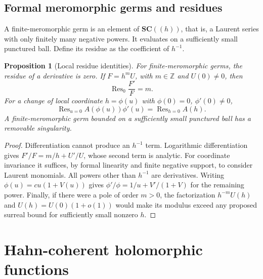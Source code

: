 \documentclass[11pt,letterpaper]{article}
\newtheorem{proposition}[theorem]{Proposition}
\theoremstyle{definition}
\theoremstyle{remark}
\newcommand{\SC}{\mathbf{SC}}
\newcommand{\Z}{\mathbb Z}
\newcommand{\res}{\operatorname{Res}}
\numberwithin{equation}{section}
\begin{document}
\subsection{Formal meromorphic germs and residues}
A finite-meromorphic germ is an element of $\SC((h))$, that is, a Laurent series with only finitely many negative powers. It evaluates on a sufficiently small punctured ball. Define its residue as the coefficient of $h^{-1}$.

\begin{proposition}[Local residue identities]\label{prop:formalres}
For finite-meromorphic germs, the residue of a derivative is zero. If $F=h^mU$, with $m\in\Z$ and $U(0)\ne0$, then
\[
 \res_0\frac{F'}F=m.
\]
For a change of local coordinate $h=\phi(u)$ with $\phi(0)=0$, $\phi'(0)\ne0$,
\[
 \res_{u=0} A(\phi(u))\phi'(u)=\res_{h=0}A(h).
\]
A finite-meromorphic germ bounded on a sufficiently small punctured ball has a removable singularity.
\end{proposition}
\begin{proof}
Differentiation cannot produce an $h^{-1}$ term. Logarithmic differentiation gives $F'/F=m/h+U'/U$, whose second term is analytic. For coordinate invariance it suffices, by formal linearity and finite negative support, to consider Laurent monomials. All powers other than $h^{-1}$ are derivatives. Writing $\phi(u)=cu(1+V(u))$ gives $\phi'/\phi=1/u+V'/(1+V)$ for the remaining power. Finally, if there were a pole of order $m>0$, the factorization $h^{-m}U(h)$ and $U(h)=U(0)(1+o(1))$ would make its modulus exceed any proposed surreal bound for sufficiently small nonzero $h$.
\end{proof}

\section{Hahn-coherent holomorphic functions}\label{sec:coherent}
\end{document}
